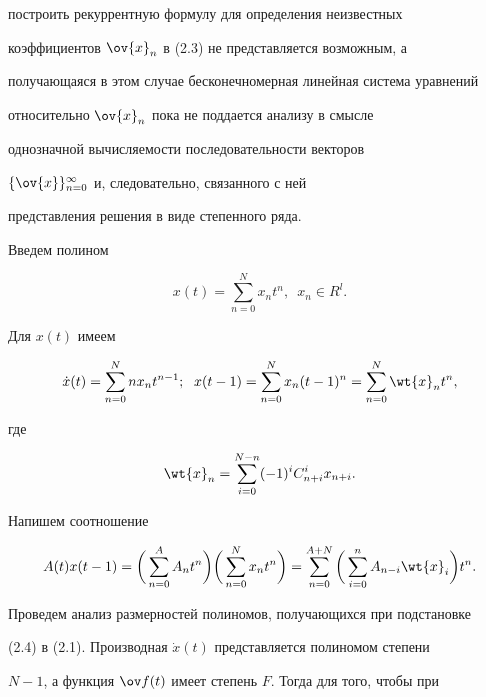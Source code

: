 построить рекуррентную формулу для определения неизвестных


коэффициентов $\ov{x}_n$ в (2.3) не представляется возможным, а


получающаяся в этом случае бесконечномерная линейная система уравнений


относительно $\ov{x}_n$ пока не поддается анализу в смысле


однозначной вычисляемости последовательности векторов


$\{\ov{x}\}_{n=0}^{\infty}$ и, следовательно, связанного с ней


представления решения в виде степенного ряда.





Введем полином


\begin{equation}


x(t)=\sum_{n=0}^{N}x_{n}t^{n},\ \;x_{n}\in R^{l}.


\end{equation}


Для $x(t)$ имеем


\begin{equation}


\Dot x(t)=\sum_{n=0}^{N}nx_{n}t^{n-1};\ \;


x(t-1)=\sum_{n=0}^{N}x_{n}(t-1)^{n}=\sum_{n=0}^{N}\wt{x}_{n}t^{n},


\end{equation}


где


$$


\wt{x}_{n}=\sum_{i=0}^{N-n}(-1)^{i}C_{n+i}^{i}x_{n+i}.


$$


Напишем соотношение


\begin{equation}


A(t)x(t-1)= \bigg(\sum_{n=0}^{A}A_{n}t^{n}\bigg)


\bigg(\sum_{n=0}^{N}x_{n}t^{n}\bigg)=


\sum_{n=0}^{A+N}\bigg(\sum_{i=0}^{n}A_{n-i}\wt{x}_{i}\bigg)t^{n}.


\end{equation}


Проведем анализ размерностей полиномов, получающихся при подстановке


(2.4) в (2.1). Производная $\Dot x(t)$ представляется полиномом степени


$N-1$, а функция $\ov f(t)$ имеет степень $F$. Тогда для того, чтобы при



